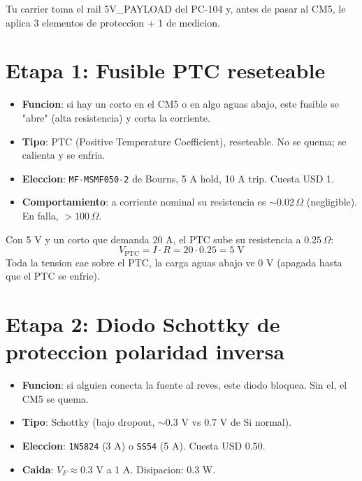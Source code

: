 \documentclass[11pt,a4paper,oneside,openright]{book}
\begin{document}
Tu carrier toma el rail 5V\_PAYLOAD del PC-104 y, antes de pasar al CM5,
le aplica 3 elementos de proteccion + 1 de medicion.

\section{Etapa 1: Fusible PTC reseteable}

\begin{itemize}[leftmargin=2em]
  \item \textbf{Funcion}: si hay un corto en el CM5 o en algo aguas abajo,
        este fusible se "abre" (alta resistencia) y corta la corriente.
  \item \textbf{Tipo}: PTC (Positive Temperature Coefficient), reseteable.
        No se quema; se calienta y se enfria.
  \item \textbf{Eleccion}: \texttt{MF-MSMF050-2} de Bourns, 5 A hold,
        10 A trip. Cuesta USD 1.
  \item \textbf{Comportamiento}: a corriente nominal su resistencia es
        $\sim 0.02\,\Omega$ (negligible). En falla, $> 100\,\Omega$.
\end{itemize}

\begin{calculo}
Con 5 V y un corto que demanda 20 A, el PTC sube su resistencia a $0.25\,\Omega$:
\[
V_{\text{PTC}} = I \cdot R = 20 \cdot 0.25 = 5\;\text{V}
\]
Toda la tension cae sobre el PTC, la carga aguas abajo ve 0 V (apagada
hasta que el PTC se enfrie).
\end{calculo}

\section{Etapa 2: Diodo Schottky de proteccion polaridad inversa}

\begin{itemize}[leftmargin=2em]
  \item \textbf{Funcion}: si alguien conecta la fuente al reves, este
        diodo bloquea. Sin el, el CM5 se quema.
  \item \textbf{Tipo}: Schottky (bajo dropout, $\sim 0.3$ V vs $0.7$ V de
        Si normal).
  \item \textbf{Eleccion}: \texttt{1N5824} (3 A) o \texttt{SS54} (5 A).
        Cuesta USD 0.50.
  \item \textbf{Caida}: $V_F \approx 0.3$ V a 1 A. Disipacion: $0.3$ W.
\end{itemize}
\end{document}
